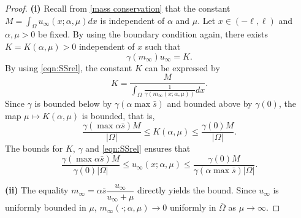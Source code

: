 \documentclass{article}
\begin{document}
\begin{proof}
\textbf{(i)} 
Recall from \eqref{mass conservation} that the constant $M=\int_\Omega u_\infty(x;\alpha,\mu)dx$ is independent of $\alpha$ and $\mu$. Let $x\in(-\ell,\ell)$ and $\alpha,\mu>0$ be fixed. 
By using the boundary condition again, there exists $K=K(\alpha,\mu)>0$ independent of $x$ such that \begin{equation}\label{eqn:SSrel}
     \gamma(m_\infty)u_\infty=K.
 \end{equation} 
   By using \eqref{eqn:SSrel}, the constant $K$ can be expressed by
\[K = \frac{M}{\int_\Omega\frac{1}{\gamma(m_\infty(x;\alpha,\mu))}dx}.\] Since $\gamma$ is bounded below by $\gamma(\alpha\max  \bar s)$ and bounded above by $\gamma(0)$, the map $\mu\mapsto K(\alpha,\mu)$ is bounded, that is, \[ \frac{\gamma(\max{\alpha \bar s}) M}{|\Omega|}\le K(\alpha,\mu)\le \frac{\gamma(0) M}{|\Omega|}.\] The bounds for $K$, $\gamma$ and \eqref{eqn:SSrel} ensures that
\[\frac{\gamma(\max{\alpha \bar s}) M}{\gamma(0)|\Omega|}\le u_\infty(x;\alpha,\mu)\le \frac{\gamma(0) M}{\gamma(\alpha \max{\bar s})|\Omega|}. \]

 
\textbf{(ii)} The equality $m_\infty = \alpha\bar s\dfrac{u_\infty}{u_\infty +\mu}$ directly yields the bound. Since $u_\infty$ is uniformly bounded in $\mu$, $m_\infty(\cdot;\alpha,\mu) \to 0$ uniformly in $\overline{\Omega}$ as $\mu\to \infty$.



\end{proof}
\end{document}
